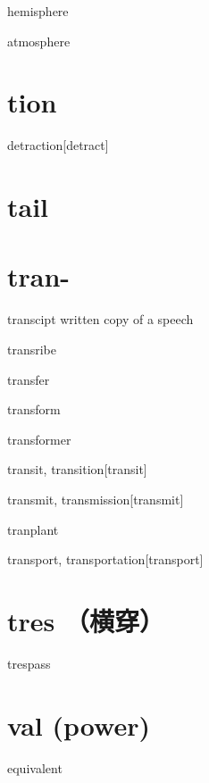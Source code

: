 \begin{RefWord}{hemisphere}
\end{RefWord}

\begin{RefWord}{atmosphere}
\end{RefWord}

\section{tion}

\begin{RefWord}{detraction}[detract]
\end{RefWord}

\section{tail}



\section{tran-}

\begin{RefWord}{transcipt}
    written copy of a speech
\end{RefWord}

\begin{RefWord}{transribe}
\end{RefWord}

\begin{RefWord}{transfer}
\end{RefWord}

\begin{RefWord}{transform}
\end{RefWord}

\begin{RefWord}{transformer}
\end{RefWord}

\begin{RefWord}{transit, transition}[transit]
\end{RefWord}

\begin{RefWord}{transmit, transmission}[transmit]
\end{RefWord}

\begin{RefWord}{tranplant}
\end{RefWord}

\begin{RefWord}{transport, transportation}[transport]
\end{RefWord}

\section{tres （横穿）}

\begin{RefWord}{trespass}
\end{RefWord}

\section{val (power)}

\begin{RefWord}{equivalent}
\end{RefWord}